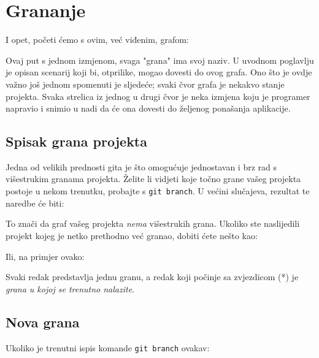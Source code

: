 \chapter*{Grananje}

I opet, početi ćemo s ovim, već viđenim, grafom:



Ovaj put s jednom izmjenom, svaga "grana" ima svoj naziv.
U uvodnom poglavlju je opisan scenarij koji bi, otprilike, mogao dovesti do ovog grafa.
Ono što je ovdje važno još jednom spomenuti je sljedeće; svaki čvor grafa je nekakvo stanje projekta. 
Svaka strelica iz jednog u drugi čvor je neka izmjena koju je programer napravio i snimio u nadi da će ona dovesti do željenog ponašanja aplikacije.

\section*{Spisak grana projekta}

Jedna od velikih prednosti gita je što omogućuje jednostavan i brz rad s višestrukim granama projekta.
Želite li vidjeti koje točno grane vašeg projekta postoje u nekom trenutku, probajte s \verb+git branch+.
U većini slučajeva, rezultat te naredbe će biti:



To znači da graf vašeg projekta \emph{nema} višestrukih grana. 
Ukoliko ste naslijedili projekt kojeg je netko prethodno već granao, dobiti ćete nešto kao:



Ili, na primjer ovako:



Svaki redak predstavlja jednu granu, a redak koji počinje sa zvjezdicom (*) je \emph{grana u kojoj se trenutno nalazite}.

\section*{Nova grana}

Ukoliko je trenutni ispis komande \verb+git branch+ ovakav:



